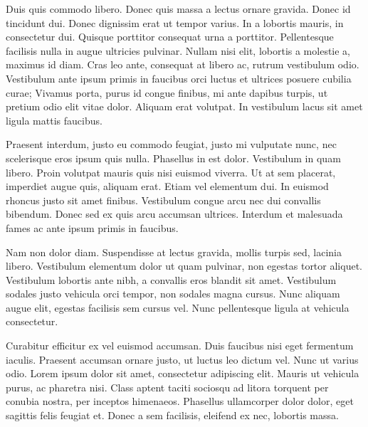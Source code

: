 Duis quis commodo libero. Donec quis massa a lectus ornare gravida. Donec id tincidunt dui. Donec dignissim erat ut tempor varius. In a lobortis mauris, in consectetur dui. Quisque porttitor consequat urna a porttitor. Pellentesque facilisis nulla in augue ultricies pulvinar. Nullam nisi elit, lobortis a molestie a, maximus id diam. Cras leo ante, consequat at libero ac, rutrum vestibulum odio. Vestibulum ante ipsum primis in faucibus orci luctus et ultrices posuere cubilia curae; Vivamus porta, purus id congue finibus, mi ante dapibus turpis, ut pretium odio elit vitae dolor. Aliquam erat volutpat. In vestibulum lacus sit amet ligula mattis faucibus.

Praesent interdum, justo eu commodo feugiat, justo mi vulputate nunc, nec scelerisque eros ipsum quis nulla. Phasellus in est dolor. Vestibulum in quam libero. Proin volutpat mauris quis nisi euismod viverra. Ut at sem placerat, imperdiet augue quis, aliquam erat. Etiam vel elementum dui. In euismod rhoncus justo sit amet finibus. Vestibulum congue arcu nec dui convallis bibendum. Donec sed ex quis arcu accumsan ultrices. Interdum et malesuada fames ac ante ipsum primis in faucibus.

Nam non dolor diam. Suspendisse at lectus gravida, mollis turpis sed, lacinia libero. Vestibulum elementum dolor ut quam pulvinar, non egestas tortor aliquet. Vestibulum lobortis ante nibh, a convallis eros blandit sit amet. Vestibulum sodales justo vehicula orci tempor, non sodales magna cursus. Nunc aliquam augue elit, egestas facilisis sem cursus vel. Nunc pellentesque ligula at vehicula consectetur.

Curabitur efficitur ex vel euismod accumsan. Duis faucibus nisi eget fermentum iaculis. Praesent accumsan ornare justo, ut luctus leo dictum vel. Nunc ut varius odio. Lorem ipsum dolor sit amet, consectetur adipiscing elit. Mauris ut vehicula purus, ac pharetra nisi. Class aptent taciti sociosqu ad litora torquent per conubia nostra, per inceptos himenaeos. Phasellus ullamcorper dolor dolor, eget sagittis felis feugiat et. Donec a sem facilisis, eleifend ex nec, lobortis massa. 
